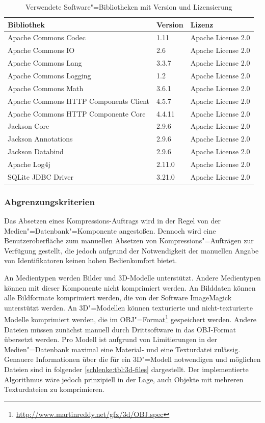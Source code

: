 \begin{table}
\begin{center}
{\footnotesize
\begin{tabular}{lll}
Bibliothek & Version & Lizenz \\
\hline
Apache Commons Codec & 1.11 & Apache License 2.0 \\
Apache Commons IO & 2.6 & Apache License 2.0 \\
Apache Commons Lang & 3.3.7 & Apache License 2.0 \\
Apache Commons Logging & 1.2 & Apache License 2.0 \\
Apache Commons Math & 3.6.1 & Apache License 2.0 \\
Apache Commons HTTP Components Client & 4.5.7 & Apache License 2.0 \\
Apache Commons HTTP Componente Core & 4.4.11 & Apache License 2.0 \\
Jackson Core & 2.9.6 & Apache License 2.0 \\
Jackson Annotations & 2.9.6 & Apache License 2.0 \\
Jackson Databind & 2.9.6 & Apache License 2.0 \\
Apache Log4j & 2.11.0 & Apache License 2.0 \\
SQLite JDBC Driver & 3.21.0 & Apache License 2.0 \\
\end{tabular}}
\caption{Verwendete Software"=Bibliotheken mit Version und Lizensierung}
\label{schlenke:tbl:libraries}
\end{center}
\end{table}

\subsubsection{Abgrenzungskriterien}

Das Absetzen eines Kompressions-Auftrags wird in der Regel von der Medien"=Datenbank"=Komponente angestoßen. Dennoch wird eine Benutzeroberfläche zum manuellen Absetzen von Kompressions"=Aufträgen zur Verfügung gestellt, die jedoch aufgrund der Notwendigkeit der manuellen Angabe von Identifikatoren keinen hohen Bedienkomfort bietet.

An Medientypen werden Bilder und 3D-Modelle unterstützt. Andere Medientypen können mit dieser Komponente nicht komprimiert werden. An Bilddaten können alle Bildformate komprimiert werden, die von der Software ImageMagick unterstützt werden. An 3D"=Modellen können texturierte und nicht-texturierte Modelle komprimiert werden, die im OBJ"=Format\footnote{\url{http://www.martinreddy.net/gfx/3d/OBJ.spec}} gespeichert werden. Andere Dateien müssen zunächst manuell durch Drittsoftware in das OBJ-Format übersetzt werden. Pro Modell ist aufgrund von Limitierungen in der Medien"=Datenbank maximal eine Material- und eine Texturdatei zulässig. Genauere Informationen über die für ein 3D"=Modell notwendigen und möglichen Dateien sind in folgender \autoref{schlenke:tbl:3d-files} dargestellt. Der implementierte Algorithmus wäre jedoch prinzipiell in der Lage, auch Objekte mit mehreren Texturdateien zu komprimieren.

